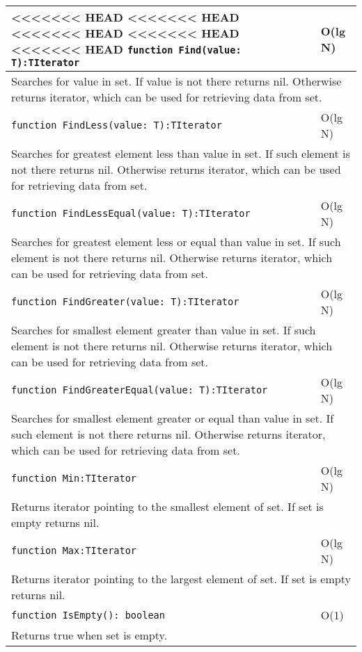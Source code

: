\begin{longtable}{|m{10cm}|m{5cm}|}
<<<<<<< HEAD
<<<<<<< HEAD
<<<<<<< HEAD
<<<<<<< HEAD
<<<<<<< HEAD
\verb!function Find(value: T):TIterator! & O(lg N) \\\hline
\multicolumn{2}{|m{15cm}|}{Searches for value in set. If value is not there returns nil. Otherwise
returns iterator, which can be used for retrieving data from set.} \\\hline\hline

\verb!function FindLess(value: T):TIterator! & O(lg N) \\\hline
\multicolumn{2}{|m{15cm}|}{Searches for greatest element less than value in set. If such element is not there returns nil. Otherwise
returns iterator, which can be used for retrieving data from set.} \\\hline\hline

\verb!function FindLessEqual(value: T):TIterator! & O(lg N) \\\hline
\multicolumn{2}{|m{15cm}|}{Searches for greatest element less or equal than value in set. If such element is not there returns nil. Otherwise
returns iterator, which can be used for retrieving data from set.} \\\hline\hline

\verb!function FindGreater(value: T):TIterator! & O(lg N) \\\hline
\multicolumn{2}{|m{15cm}|}{Searches for smallest element greater than value in set. If such element is not there returns nil. Otherwise
returns iterator, which can be used for retrieving data from set.} \\\hline\hline

\verb!function FindGreaterEqual(value: T):TIterator! & O(lg N) \\\hline
\multicolumn{2}{|m{15cm}|}{Searches for smallest element greater or equal than value in set. If such element is not there returns nil. Otherwise
returns iterator, which can be used for retrieving data from set.} \\\hline\hline

\verb!function Min:TIterator! & O(lg N) \\\hline
\multicolumn{2}{|m{15cm}|}{Returns iterator pointing to the smallest element of set. If set is empty returns
nil.} \\\hline\hline

\verb!function Max:TIterator! & O(lg N) \\\hline
\multicolumn{2}{|m{15cm}|}{Returns iterator pointing to the largest element of set. If set is empty returns
nil.} \\\hline\hline

\verb!function IsEmpty(): boolean! & O(1) \\ \hline
\multicolumn{2}{|m{15cm}|}{Returns true when set is empty.} \\\hline

\end{longtable}

